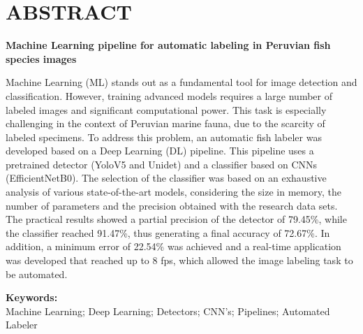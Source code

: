\chapter*{\center \Large \vspace{-4.5cm} ABSTRACT}

\begin{center}
\Large \vspace{-1.5cm} \textbf{Machine Learning pipeline for automatic labeling
in Peruvian fish species images}
\end{center}

Machine Learning (ML) stands out as a fundamental tool for image 
detection and classification. However, training advanced models 
requires a large number of labeled images and significant 
computational power. This task is especially challenging in the 
context of Peruvian marine fauna, due to the scarcity of labeled 
specimens. To address this problem, an automatic fish labeler was 
developed based on a Deep Learning (DL) pipeline. This pipeline 
uses a pretrained detector (YoloV5 and Unidet) and a classifier 
based on CNNs (EfficientNetB0). The selection of the classifier 
was based on an exhaustive analysis of various state-of-the-art 
models, considering the size in memory, the number of parameters 
and the precision obtained with the research data sets. The practical 
results showed a partial precision of the detector of 79.45\%, while 
the classifier reached 91.47\%, thus generating a final accuracy of
72.67\%. In addition, a minimum error of 22.54\% was achieved and a 
real-time application was developed that reached up to 8 fps, which 
allowed the image labeling task to be automated.

\noindent \textbf{Keywords:}\\
\noindent Machine Learning; Deep Learning; Detectors; CNN's; Pipelines; Automated Labeler

